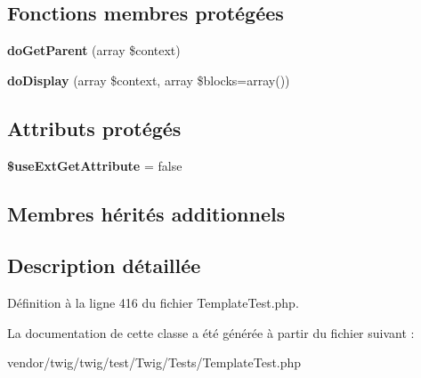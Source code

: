 \subsection*{Fonctions membres protégées}
\begin{DoxyCompactItemize}
\item 
{\bfseries do\+Get\+Parent} (array \$context)\hypertarget{class_twig___template_test_a8a2d1d26863a5dbc3220201cdb4e3b0c}{}\label{class_twig___template_test_a8a2d1d26863a5dbc3220201cdb4e3b0c}

\item 
{\bfseries do\+Display} (array \$context, array \$blocks=array())\hypertarget{class_twig___template_test_adb62b7c226e07d30f836ed16158d924f}{}\label{class_twig___template_test_adb62b7c226e07d30f836ed16158d924f}

\end{DoxyCompactItemize}
\subsection*{Attributs protégés}
\begin{DoxyCompactItemize}
\item 
{\bfseries \$use\+Ext\+Get\+Attribute} = false\hypertarget{class_twig___template_test_a4ce23ade62b328ce6d8eaae9b4441832}{}\label{class_twig___template_test_a4ce23ade62b328ce6d8eaae9b4441832}

\end{DoxyCompactItemize}
\subsection*{Membres hérités additionnels}


\subsection{Description détaillée}


Définition à la ligne 416 du fichier Template\+Test.\+php.



La documentation de cette classe a été générée à partir du fichier suivant \+:\begin{DoxyCompactItemize}
\item 
vendor/twig/twig/test/\+Twig/\+Tests/Template\+Test.\+php\end{DoxyCompactItemize}

